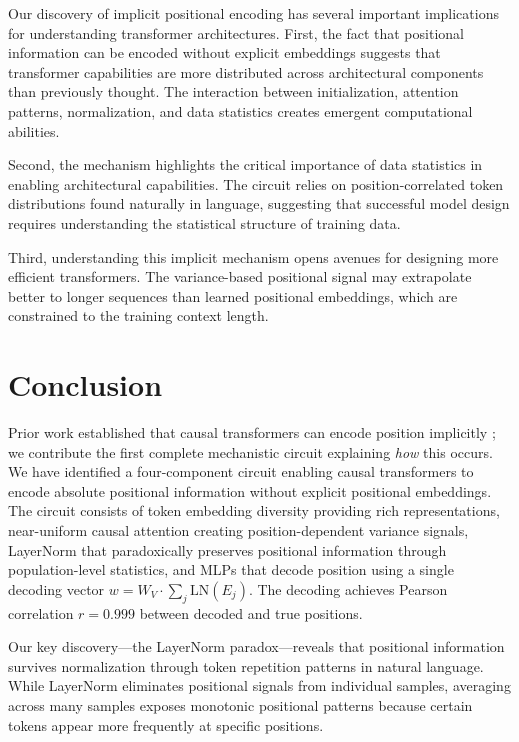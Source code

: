 \documentclass[11pt]{article}
\begin{document}
Our discovery of implicit positional encoding has several important implications for understanding transformer architectures. First, the fact that positional information can be encoded without explicit embeddings suggests that transformer capabilities are more distributed across architectural components than previously thought. The interaction between initialization, attention patterns, normalization, and data statistics creates emergent computational abilities.

Second, the mechanism highlights the critical importance of data statistics in enabling architectural capabilities. The circuit relies on position-correlated token distributions found naturally in language, suggesting that successful model design requires understanding the statistical structure of training data.

Third, understanding this implicit mechanism opens avenues for designing more efficient transformers. The variance-based positional signal may extrapolate better to longer sequences than learned positional embeddings, which are constrained to the training context length.

\section{Conclusion}

Prior work established that causal transformers can encode position implicitly \citep{haviv2022transformer, chi-etal-2023-latent}; we contribute the first complete mechanistic circuit explaining \textit{how} this occurs. We have identified a four-component circuit enabling causal transformers to encode absolute positional information without explicit positional embeddings. The circuit consists of token embedding diversity providing rich representations, near-uniform causal attention creating position-dependent variance signals, LayerNorm that paradoxically preserves positional information through population-level statistics, and MLPs that decode position using a single decoding vector $w = W_V \cdot \sum_j \text{LN}(E_j)$. The decoding achieves Pearson correlation $r = 0.999$ between decoded and true positions.

Our key discovery---the LayerNorm paradox---reveals that positional information survives normalization through token repetition patterns in natural language. While LayerNorm eliminates positional signals from individual samples, averaging across many samples exposes monotonic positional patterns because certain tokens appear more frequently at specific positions.
\end{document}
